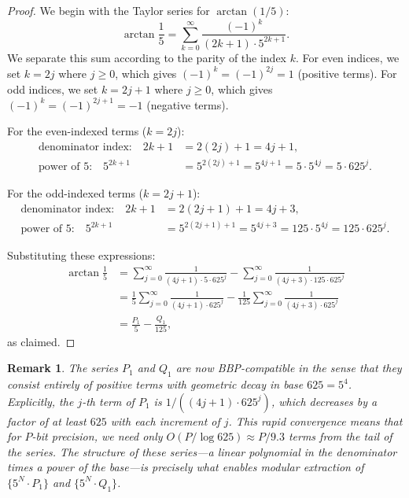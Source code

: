 \documentclass[11pt]{article}
\newtheorem{remark}[theorem]{Remark}
\begin{document}
\begin{proof}
We begin with the Taylor series for $\arctan(1/5)$:
\[
\arctan\frac{1}{5} = \sum_{k=0}^{\infty} \frac{(-1)^k}{(2k+1) \cdot 5^{2k+1}}.
\]
We separate this sum according to the parity of the index $k$. For even indices, we set $k = 2j$ where $j \geq 0$, which gives $(-1)^k = (-1)^{2j} = 1$ (positive terms). For odd indices, we set $k = 2j+1$ where $j \geq 0$, which gives $(-1)^k = (-1)^{2j+1} = -1$ (negative terms).

For the even-indexed terms ($k = 2j$):
\begin{align*}
\text{denominator index:} \quad 2k+1 &= 2(2j)+1 = 4j+1, \\
\text{power of 5:} \quad 5^{2k+1} &= 5^{2(2j)+1} = 5^{4j+1} = 5 \cdot 5^{4j} = 5 \cdot 625^j.
\end{align*}

For the odd-indexed terms ($k = 2j+1$):
\begin{align*}
\text{denominator index:} \quad 2k+1 &= 2(2j+1)+1 = 4j+3, \\
\text{power of 5:} \quad 5^{2k+1} &= 5^{2(2j+1)+1} = 5^{4j+3} = 125 \cdot 5^{4j} = 125 \cdot 625^j.
\end{align*}

Substituting these expressions:
\begin{align*}
\arctan\frac{1}{5} &= \sum_{j=0}^{\infty} \frac{1}{(4j+1) \cdot 5 \cdot 625^j} - \sum_{j=0}^{\infty} \frac{1}{(4j+3) \cdot 125 \cdot 625^j} \\[6pt]
&= \frac{1}{5} \sum_{j=0}^{\infty} \frac{1}{(4j+1) \cdot 625^j} - \frac{1}{125} \sum_{j=0}^{\infty} \frac{1}{(4j+3) \cdot 625^j} \\[6pt]
&= \frac{P_1}{5} - \frac{Q_1}{125},
\end{align*}
as claimed.
\end{proof}

\begin{remark}
The series $P_1$ and $Q_1$ are now BBP-compatible in the sense that they consist entirely of positive terms with geometric decay in base $625 = 5^4$. Explicitly, the $j$-th term of $P_1$ is $1/((4j+1) \cdot 625^j)$, which decreases by a factor of at least $625$ with each increment of $j$. This rapid convergence means that for $P$-bit precision, we need only $O(P/\log 625) \approx P/9.3$ terms from the tail of the series. The structure of these series---a linear polynomial in the denominator times a power of the base---is precisely what enables modular extraction of $\{5^N \cdot P_1\}$ and $\{5^N \cdot Q_1\}$.
\end{remark}
\end{document}
